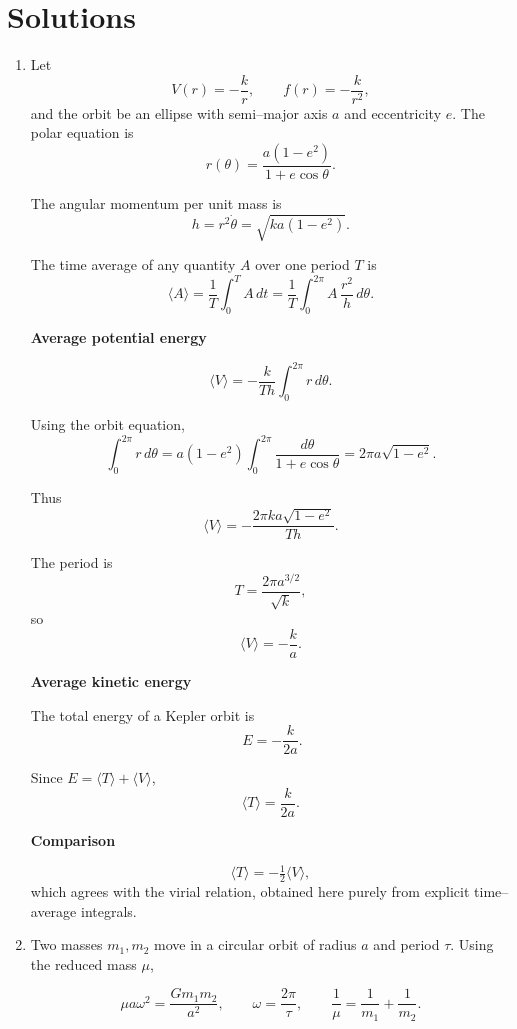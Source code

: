 \documentclass[../main.tex]{subfiles}
\begin{document}
\maketitle

\section*{Solutions}

\begin{enumerate}

\item Let
\[
V(r)=-\frac{k}{r}, \qquad f(r)=-\frac{k}{r^2},
\]
and the orbit be an ellipse with semi–major axis \(a\) and eccentricity \(e\).
The polar equation is
\[
r(\theta)=\frac{a(1-e^2)}{1+e\cos\theta}.
\]

The angular momentum per unit mass is
\[
h=r^2\dot\theta=\sqrt{k a(1-e^2)}.
\]

The time average of any quantity \(A\) over one period \(T\) is
\[
\langle A\rangle=\frac{1}{T}\int_0^T A\,dt
=\frac{1}{T}\int_0^{2\pi} A\,\frac{r^2}{h}\,d\theta .
\]

\textbf{Average potential energy}

\[
\langle V\rangle
=-\frac{k}{Th}\int_0^{2\pi} r\,d\theta .
\]

Using the orbit equation,
\[
\int_0^{2\pi} r\,d\theta
=a(1-e^2)\int_0^{2\pi}\frac{d\theta}{1+e\cos\theta}
=2\pi a\sqrt{1-e^2}.
\]

Thus
\[
\langle V\rangle
=-\frac{2\pi k a\sqrt{1-e^2}}{Th}.
\]

The period is
\[
T=\frac{2\pi a^{3/2}}{\sqrt{k}},
\]
so
\[
\boxed{\langle V\rangle=-\frac{k}{a}}.
\]

\newpage

\textbf{Average kinetic energy}

The total energy of a Kepler orbit is
\[\ 
E=-\frac{k}{2a}.
\]

Since \(E=\langle T\rangle+\langle V\rangle\),
\[
\boxed{\langle T\rangle=\frac{k}{2a}}.
\]

\textbf{Comparison}

\[
\boxed{\langle T\rangle=-\tfrac12\langle V\rangle},
\]
which agrees with the virial relation, obtained here purely from explicit
time–average integrals.


\item Two masses \(m_1,m_2\) move in a circular orbit of radius \(a\) and period \(\tau\).
Using the reduced mass \(\mu\),

\[
\mu a\omega^2=\frac{G m_1 m_2}{a^2}, 
\qquad 
\omega=\frac{2\pi}{\tau},
\qquad
\frac{1}{\mu}=\frac{1}{m_1}+\frac{1}{m_2}.
\]


\end{enumerate}
\end{document}
